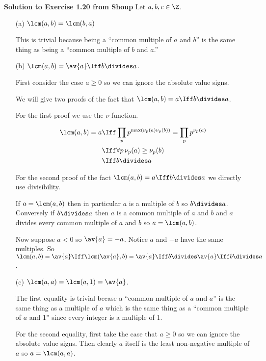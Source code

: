 \documentclass[oneside,12pt]{amsart}
\begin{document}
\textbf{Solution to Exercise 1.20 from Shoup} Let $a,b,c\in\Z$.
\begin{enumerate}
\item[(a)] $\lcm(a,b)=\lcm(b,a)$
\begin{subproof}
This is trivial because being a ``common multiple of $a$ and $b$'' is the same thing
as being a ``common multiple of $b$ and $a$.''
\end{subproof}
\item[(b)] $\lcm(a,b)=\av{a} \Iff b\divides a$.
\begin{subproof}
First consider the case $a\geq 0$ so we can ignore the absolute value signs. 

We will give two proofs of the fact that $\lcm(a,b) = a \Iff b\divides a$.

For the first proof we use the $\nu$ function.

\begin{align*}
\lcm(a,b) = a &\Iff \prod_p p^{\max\left(\nu_p(a)\nu_p(b)\right)} = \prod_p p^{\nu_p(a)} \\
              &\Iff \forall p \, \nu_p(a)\geq \nu_p(b) \\
              &\Iff b\divides a
\end{align*}


For the second proof of the fact $\lcm(a,b) = a \Iff b\divides a$ we directly use
divisibility.

If $a=\lcm(a,b)$ then in particular $a$ is a multiple of $b$ so $b\divides a$. Conversely if
$b\divides a$ then $a$ is a common multiple of $a$ and $b$ and $a$ divides every common
multiple of $a$ and $b$ so $a=\lcm(a,b)$.
 
Now suppose $a<0$ so $\av{a}=-a$. Notice $a$ and $-a$ have the same multiples. 
So $\lcm(a,b) = \av{a} \Iff \lcm(\av{a},b) = \av{a} \Iff b\divides\av{a} \Iff b\divides a$.
\end{subproof}

\item[(c)] $\lcm(a,a)=\lcm(a,1)=\av{a}$.
\begin{subproof}
The first equality is trivial becase a ``common multiple of $a$ and $a$'' is the same
thing as a multiple of $a$ which is the same thing as a ``common multiple of $a$ and 1'' 
since every integer is a multiple of 1.

For the second equality, first take the case that $a\geq 0$ so we can ignore the absolute
value signs. Then clearly $a$ itself is
the least non-negative multiple of $a$ so $a = \lcm(a,a)$.


\end{subproof}
\end{enumerate}
\end{document}
